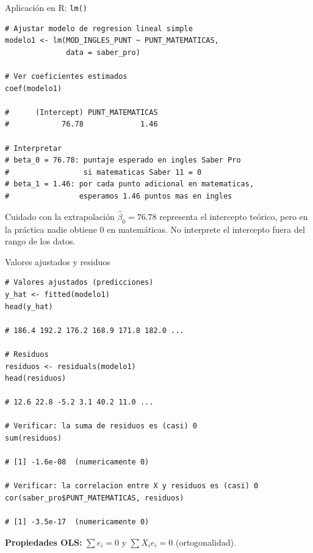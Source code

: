 \documentclass[aspectratio=169, 11pt]{beamer}
\begin{document}
\begin{frame}[fragile]{Aplicación en R: \texttt{lm()}}
\begin{lstlisting}[basicstyle=\ttfamily\scriptsize]
# Ajustar modelo de regresion lineal simple
modelo1 <- lm(MOD_INGLES_PUNT ~ PUNT_MATEMATICAS,
              data = saber_pro)

# Ver coeficientes estimados
coef(modelo1)

#      (Intercept) PUNT_MATEMATICAS
#            76.78             1.46

# Interpretar
# beta_0 = 76.78: puntaje esperado en ingles Saber Pro
#                 si matematicas Saber 11 = 0
# beta_1 = 1.46: por cada punto adicional en matematicas,
#                esperamos 1.46 puntos mas en ingles
\end{lstlisting}

\vspace{0.2cm}
\begin{alertblock}{Cuidado con la extrapolación}
$\hat{\beta}_0 = 76.78$ representa el intercepto teórico, pero en la práctica nadie obtiene 0 en matemáticas. No interprete el intercepto fuera del rango de los datos.
\end{alertblock}
\end{frame}

\begin{frame}[fragile]{Valores ajustados y residuos}
\begin{lstlisting}[basicstyle=\ttfamily\scriptsize,aboveskip=0pt,belowskip=0pt]
# Valores ajustados (predicciones)
y_hat <- fitted(modelo1)
head(y_hat)

# 186.4 192.2 176.2 168.9 171.8 182.0 ...

# Residuos
residuos <- residuals(modelo1)
head(residuos)

# 12.6 22.8 -5.2 3.1 40.2 11.0 ...

# Verificar: la suma de residuos es (casi) 0
sum(residuos)

# [1] -1.6e-08  (numericamente 0)

# Verificar: la correlacion entre X y residuos es (casi) 0
cor(saber_pro$PUNT_MATEMATICAS, residuos)

# [1] -3.5e-17  (numericamente 0)
\end{lstlisting}

{\small \textbf{Propiedades OLS:} $\sum e_i = 0$ y $\sum X_i e_i = 0$ (ortogonalidad).}
\end{frame}
\end{document}
